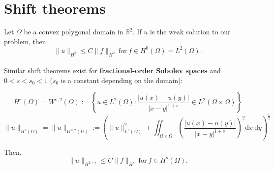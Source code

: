 \documentclass[pagesize]{scrartcl}
\begin{document}
\flushleft







\vspace{0.1cm}
\section{Shift theorems}

Let $\Omega$ be a convex polygonal domain in $\mathbb{R}^2$. If $u$ is the weak solution to our problem, then %
\begin{equation}
	\| u \|_{H^2} \leq C \| f \|_{H^0} \ \text{for} \ f \in H^0(\Omega) = L^2(\Omega).  \label{st}
\end{equation}\\[0.5ex]

Similar shift theorems exist for \textbf{fractional-order Sobolev spaces} and $0 < s < s_0 < 1$ ($s_0$ is a constant depending on the domain):

\begin{equation*}
	H^s(\Omega) = W^{s,2}(\Omega) := \left\{ u \in L^2(\Omega): \frac{|u(x)-u(y)|}{|x-y|^{1+s}} \in  L^2(\Omega \times \Omega) \right\}
\end{equation*}
\begin{equation*}
	\|u\|_{H^s(\Omega)} = \|u\|_{W^{s,2}(\Omega)} := \left( \|u\|_{L^2(\Omega)}^2 + \iint_{\Omega \times \Omega} \left( \frac{|u(x)-u(y)|}{|x-y|^{1+s}} \right)^2  \text{d}x \ \text{d}y \right)^\frac{1}{2}
\end{equation*}


Then, 
\begin{equation*}
	\|u\|_{H^{2+s}} \leq C \|f\|_{H^s} \ \text{for} \ f \in H^s(\Omega). \label{fo}
\end{equation*}\\[0.3cm]
\end{document}

